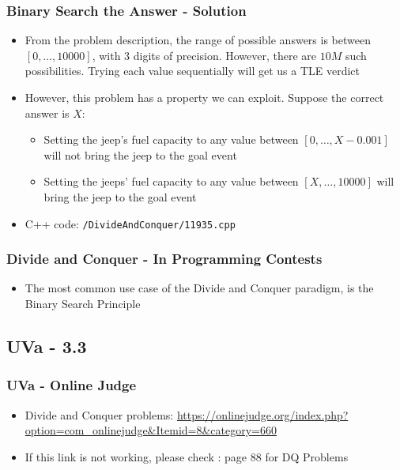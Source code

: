 \documentclass{beamer}
\begin{document}
\begin{frame}[fragile]
\frametitle{Binary Search the Answer - Solution}

\begin{itemize}
    \item From the problem description, the range of possible answers is between $[0, \ldots, 10000]$, with 3 digits of precision. However, there are $10M$ such possibilities. Trying each value sequentially will get us a TLE verdict
    \item However, this problem has a property we can exploit. Suppose the correct answer is $X$:
    	\begin{itemize}
		    \item Setting the jeep's fuel capacity to any value between $[0,\ldots,X-0.001]$ will not bring the jeep to the goal event
		    \item Setting the jeeps' fuel capacity to any value between $[X,\ldots,10000]$ will bring the jeep to the goal event
		\end{itemize}
	\item C++ code: \color{red}\verb|/DivideAndConquer/11935.cpp|\color{black}
\end{itemize}

\end{frame}

\begin{frame}
\frametitle{Divide and Conquer - In Programming Contests}

\begin{itemize}
    \item The most common use case of the Divide and Conquer paradigm, is the Binary Search Principle
\end{itemize}

\end{frame}

\subsection{UVa - 3.3}
\begin{frame}[fragile]
\frametitle{UVa - Online Judge}
	\begin{itemize}
	    \item Divide and Conquer problems: \url{https://onlinejudge.org/index.php?option=com_onlinejudge&Itemid=8&category=660}
	    \item If this link is not working, please check \cite{Halim}: page 88 for DQ Problems
	\end{itemize}
\end{frame}
\end{document}
